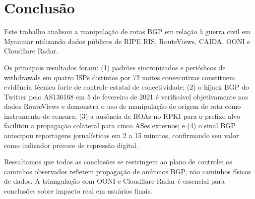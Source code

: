 \documentclass[12pt]{article}
\begin{document}
\section{Conclusão}

Este trabalho analisou a manipulação de rotas BGP em
relação à guerra civil em Myanmar utilizando
dados públicos de RIPE RIS, RouteViews, CAIDA, OONI e Cloudflare Radar.

Os principais resultados foram: (1) padrões sincronizados e periódicos de
withdrawals em quatro ISPs distintos por 72 noites consecutivas constituem
evidência técnica forte de controle estatal de conectividade; (2) o hijack
BGP do Twitter pelo AS136168 em 5 de fevereiro de 2021 é verificável
objetivamente nos dados RouteViews e demonstra o uso de manipulação de origem
de rota como instrumento de censura; (3) a ausência de ROAs no RPKI para o
prefixo alvo facilitou a propagação colateral para cinco ASes externos; e
(4) o sinal BGP antecipou reportagens jornalísticas em 2 a 15 minutos,
confirmando seu valor como indicador precoce de repressão digital.

Ressaltamos que todas as conclusões se restringem ao plano de controle: os
caminhos observados refletem propagação de anúncios BGP, não caminhos físicos
de dados. A triangulação com OONI e Cloudflare Radar é essencial para
conclusões sobre impacto real em usuários finais.



\end{document}
